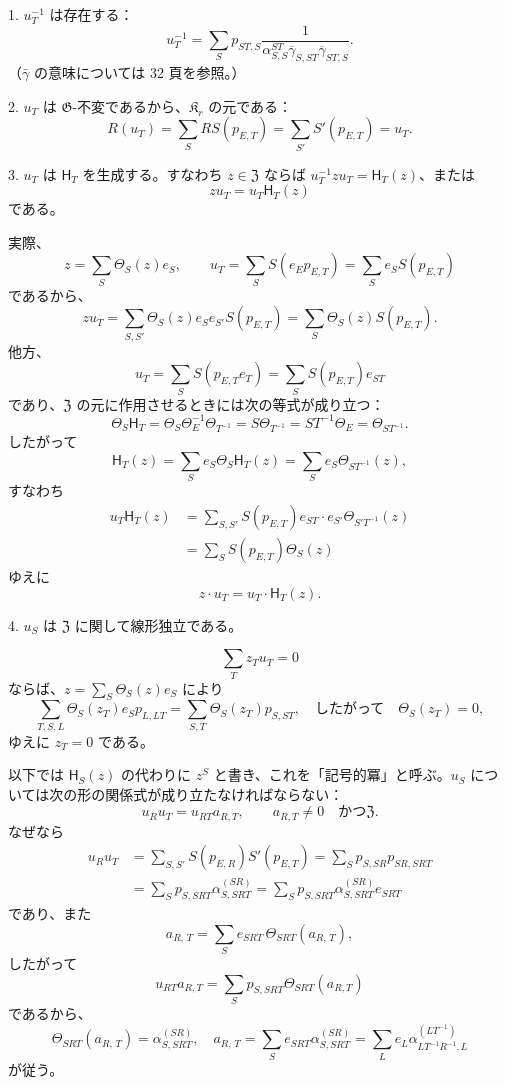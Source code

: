 1. \(u_T^{-1}\) は存在する：
\[
u_T^{-1}=\sum_S p_{ST,S}
\frac{1}{\alpha_{S,S}^{ST}\overline{\gamma}_{S,ST}\overline{\gamma}_{ST,S}}.
\]
（\(\bar\gamma\) の意味については 32 頁を参照。）

2. \(u_T\) は \(\mathfrak G\)-不変であるから、\(\mathfrak K_r\) の元である：
\[
R(u_T)=\sum_S RS(p_{E,T})=\sum_{S'} S'(p_{E,T})=u_T.
\]

3. \(u_T\) は \(\mathsf{H}_T\) を生成する。すなわち \(z\in\mathfrak Z\) ならば \(u_T^{-1}zu_T=\mathsf{H}_T(z)\)、または
\[
z u_T=u_T \mathsf{H}_T(z)
\]
である。

実際、
\[
z=\sum_S\Theta_S(z)e_S,\qquad
u_T=\sum_S S(e_Ep_{E,T})=\sum_S e_S S(p_{E,T})
\]
であるから、
\[
zu_T=\sum_{S,S'}\Theta_S(z)e_Se_{S'}S(p_{E,T})
=\sum_S\Theta_S(z)S(p_{E,T}).
\]
他方、
\[
u_T=\sum_S S(p_{E,T}e_T)=\sum_S S(p_{E,T})e_{ST}
\]
であり、\(\mathfrak Z\) の元に作用させるときには次の等式が成り立つ：
\[
\Theta_S \mathsf{H}_T=\Theta_S\Theta_E^{-1}\Theta_{T^{-1}}
=S\Theta_{T^{-1}}=ST^{-1}\Theta_E=\Theta_{ST^{-1}}.
\]
したがって
\[
\mathsf{H}_T(z)=\sum_S e_S\Theta_S \mathsf{H}_T(z)=\sum_S e_S\Theta_{ST^{-1}}(z),
\]
すなわち
\[
\begin{aligned}
u_T\mathsf{H}_T(z)
&=\sum_{S,S'} S(p_{E,T})e_{ST}\cdot e_{S'}\Theta_{S'T^{-1}}(z)\\
&=\sum_S S(p_{E,T})\Theta_S(z)
\end{aligned}
\]
ゆえに
\[
z\cdot u_T=u_T\cdot \mathsf{H}_T(z).
\]

4. \(u_S\) は \(\mathfrak Z\) に関して線形独立である。

\[
\sum_T z_Tu_T=0
\]
ならば、\(z=\sum_S\Theta_S(z)e_S\) により
\[
\sum_{T,S,L}\Theta_S(z_T)e_Sp_{L,LT}
=\sum_{S,T}\Theta_S(z_T)p_{S,ST},
\quad\text{したがって}\quad
\Theta_S(z_T)=0,
\]
ゆえに \(z_T=0\) である。

以下では \(\mathsf{H}_S(z)\) の代わりに \(z^S\) と書き、これを「記号的冪」と呼ぶ。\(u_S\) については次の形の関係式が成り立たなければならない：
\[
u_Ru_T=u_{RT}a_{R,T},\qquad a_{R,T}\ne0\quad\text{かつ}\mathfrak Z.
\]
なぜなら
\[
\begin{aligned}
u_Ru_T
&=\sum_{S,S'} S(p_{E,R})S'(p_{E,T})
=\sum_S p_{S,SR}p_{SR,SRT}\\
&=\sum_S p_{S,SRT}\alpha_{S,SRT}^{(SR)}
=\sum_S p_{S,SRT}\alpha_{S,SRT}^{(SR)}e_{SRT}
\end{aligned}
\]
であり、また
\[
a_{R,\,T}=\sum_S e_{SRT}\,\Theta_{SRT}\left(a_{R,\,T}\right),
\]
したがって
\[
u_{RT}a_{R,T}=\sum_S p_{S,SRT}\Theta_{SRT}(a_{R,T})
\]
であるから、
\[
\Theta_{SRT}(a_{R,\,T})=\alpha_{S,SRT}^{(SR)},
\quad
a_{R,\,T}=\sum_S e_{SRT}\alpha_{S,SRT}^{(SR)}
=\sum_L e_L\alpha_{LT^{-1}R^{-1},L}^{(LT^{-1})}
\]
が従う。

